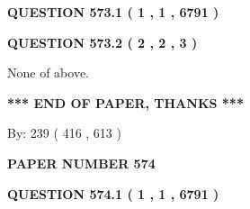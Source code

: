 \documentclass[12pt]{article}
\begin{document}
   
 \vspace{0.2in}
 
 
 
 
   
   
  
\vspace{0.2in}
  
{\textbf{\Large{QUESTION
573.1 
 ( 1 , 1 , 6791 )
}}}
  
  
  
\vspace{0.2in}
  
{\textbf{\Large{QUESTION
573.2 
 ( 2 , 2 , 3 )
}}}
  
  
 
 
\noindent{}
 
 
 None of above.
 
 
 
 
   
   
 \vspace{0.2in}
 
   
   
   
   
\vspace{1.0in} 
{\textbf{\large{ *** END OF PAPER, THANKS *** }}} 
   
   
\hspace{1.0in} By: 
 239 ( 416 ,  613 )
   
   
   
   
\newpage 
\setcounter{page}{ 
   574001 } 
   
   
   
   
 {\textbf{ \Large{ PAPER NUMBER  574  }}}
   
   
\vspace{0.2in}
   
   
   
   
   
   
 \vspace{0.2in}
 
 
 
 
   
   
  
\vspace{0.2in}
  
{\textbf{\Large{QUESTION
574.1 
 ( 1 , 1 , 6791 )
}}}
  
  
  
\end{document}
